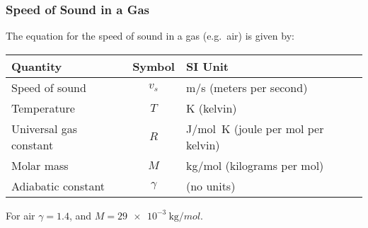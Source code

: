 \documentclass[12pt,aspectratio=169]{beamer}
\newcommand{\eq}[2]{\vspace{#1}{\Large\begin{displaymath}#2\end{displaymath}}}
\begin{document}
\begin{frame}
  \frametitle{Speed of Sound in a Gas}
  The equation for the speed of sound in a gas (e.g.\ air) is given by:

  \eq{-.2in}{
    \boxed{v_s=\sqrt{\frac{\gamma RT}{M}}}
  }
  \begin{center}
    \begin{tabular}{l|c|l}
      \rowcolor{pink}
      \textbf{Quantity} & \textbf{Symbol} & \textbf{SI Unit} \\ \hline
      Speed of sound     & $v_s$ & \si{m/s} (meters per second) \\      
      Temperature        & $T$  & \si{\kelvin} (kelvin)\\
      Universal gas constant & $R$  & \si{J/mol.K} (joule per mol per kelvin)\\
      Molar mass & $M$  & \si{\kilo\gram/mol} (kilograms per mol)\\
      Adiabatic constant  & $\gamma$  & (no units)
    \end{tabular}
  \end{center}
  For air $\gamma=1.4$, and $M=\SI{29e-3}{\kilo\gram/mol}$.
\end{frame}
\end{document}
